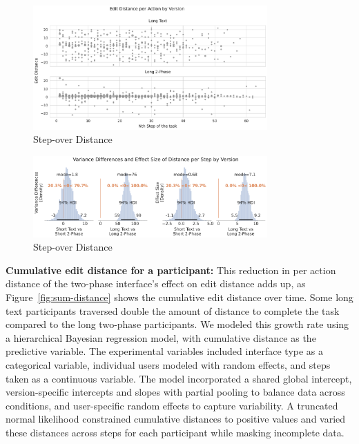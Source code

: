 \begin{figure}[ht]
    \centering
    \includegraphics[width=0.8\textwidth]{content/image/distance/edit_distance_per_action_by_version.pdf}
    \caption{Step-over Distance}
    \label{fig:step-over-distance}
\end{figure}
\begin{figure}[ht]
    \centering
    \includegraphics[width=0.8\textwidth]{content/image/distance/distance_diff_per_step_effect_size_by_version.pdf}
    \caption{Step-over Distance}
    \label{fig:step-over-distance_bayesian}
\end{figure}

\textbf{Cumulative edit distance for a participant:} This reduction in per action distance of the two-phase interface's effect on edit distance adds up, as Figure~\ref{fig:sum-distance} shows the cumulative edit distance over time. Some long text participants traversed double the amount of distance to complete the task compared to the long two-phase participants. We modeled this growth rate using a hierarchical Bayesian regression model, with cumulative distance as the predictive variable. The experimental variables included interface type as a categorical variable, individual users modeled with random effects, and steps taken as a continuous variable. The model incorporated a shared global intercept, version-specific intercepts and slopes with partial pooling to balance data across conditions, and user-specific random effects to capture variability. A truncated normal likelihood constrained cumulative distances to positive values and varied these distances across steps for each participant while masking incomplete data. 

